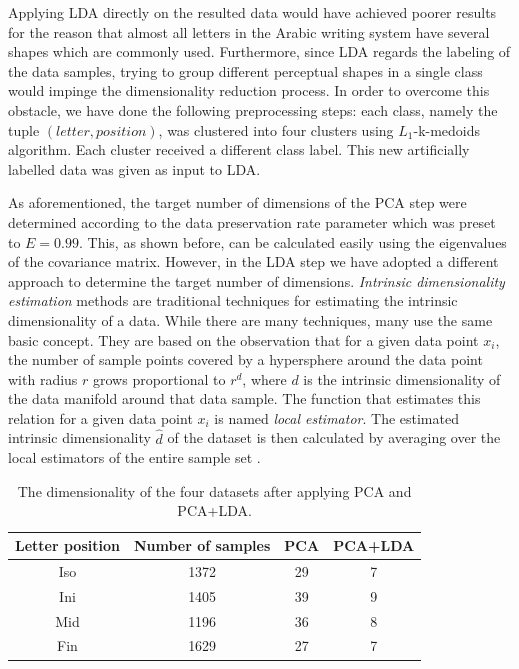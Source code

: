 \iftoggle{edit-mode}{\hspace{0pt}\marginpar{Implementation: Clustering and LDA}}{}
Applying LDA directly on the resulted data would have achieved poorer results for the reason that almost all letters in the Arabic writing system have several shapes which are commonly used. Furthermore, since LDA regards the labeling of the data samples, trying to group different perceptual shapes in a single class would impinge the dimensionality reduction process. 
In order to overcome this obstacle, we have done the following preprocessing steps: each class, namely the tuple $(letter, position)$, was clustered into four clusters using $L_1$-k-medoids algorithm. Each cluster received a different class label. This new artificially labelled data was given as input to LDA.

\iftoggle{edit-mode}{\hspace{0pt}\marginpar{LDA target dimensionality}}{}
As aforementioned, the target number of dimensions of the PCA step were determined according to the data preservation rate parameter which was preset to $E=0.99$. This, as shown before, can be calculated easily using the eigenvalues of the covariance matrix. However, in the LDA step we have adopted a different approach to determine the target number of dimensions. \emph{Intrinsic dimensionality estimation} methods are traditional techniques for estimating the intrinsic dimensionality of a data. While there are many techniques, many use the same basic concept. They are based on the observation that for a given data point $x_i$, the number of sample points covered by a hypersphere around the data point with radius $r$ grows proportional to $r^d$, where $d$ is the intrinsic dimensionality of the data manifold around that data sample.  
The function that estimates this relation for a given data point $x_i$ is named \emph{local estimator}.
The estimated intrinsic dimensionality $\hat{d}$ of the dataset is then calculated by averaging over the local estimators of the entire sample set \cite{van2007introduction}.

\begin{table}
\centering
\begin{tabular}{ | c | c | c | c |}
\hline
Letter position & Number of samples & PCA & PCA+LDA\\
\hline                 
  Iso & 1372 & 29 & 7 \\ 
  \hline
  Ini & 1405 & 39 & 9 \\ 
  \hline
  Mid & 1196 & 36 & 8 \\ 
  \hline
  Fin & 1629 & 27 & 7 \\ 
  \hline
\end{tabular}
\caption{The dimensionality of the four datasets after applying PCA and PCA+LDA.}
\label{table:dr_dimensions_results} 
\end{table}

